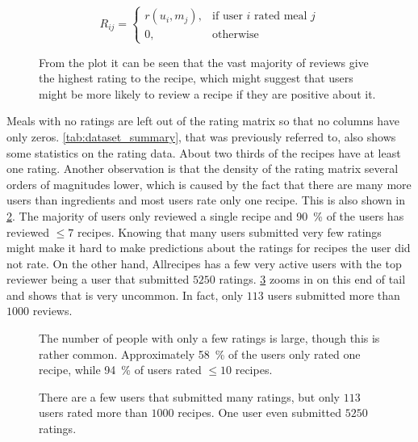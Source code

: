 \begin{equation*}
	\tag{Rating matrix}
	R_{ij}=
	\begin{cases}
	    r(u_i, m_j),& \text{if user } i \text{ rated meal } j \\
	    0,& \text{otherwise}
	\end{cases}
\end{equation*}

\begin{figure}[htbp]
	\centering
	
	\caption{From the plot it can be seen that the vast majority of reviews give the highest rating to the recipe, which might suggest that users might be more likely to review a recipe if they are positive about it.}
	\label{fig:user_ratings}
\end{figure}

Meals with no ratings are left out of the rating matrix so that no columns have only zeros.
\cref{tab:dataset_summary}, that was previously referred to, also shows some statistics on the rating data.
About two thirds of the recipes have at least one rating.
Another observation is that the density of the rating matrix several orders of magnitudes lower, which is caused by the fact that there are many more users than ingredients and most users rate only one recipe.
This is also shown in \cref{fig:user_little_ratings}.
The majority of users only reviewed a single recipe and \SI{90}{\percent} of the users has reviewed $\leq 7$ recipes.
Knowing that many users submitted very few ratings might make it hard to make predictions about the ratings for recipes the user did not rate.
On the other hand, Allrecipes has a few very active users with the top reviewer being a user that submitted $\num{5250}$ ratings.
\cref{fig:user_many_ratings} zooms in on this end of tail and shows that is very uncommon.
In fact, only $113$ users submitted more than $\num{1000}$ reviews.

\begin{figure}[htbp]
	\centering
	
	\caption{The number of people with only a few ratings is large, though this is rather common. Approximately \SI{58}{\percent} of the users only rated one recipe, while \SI{94}{\percent} of users rated $\leq 10$ recipes.}
	\label{fig:user_little_ratings}
\end{figure}

\begin{figure}[htbp]
	\centering
	
	\caption{There are a few users that submitted many ratings, but only $113$ users rated more than $1000$ recipes. One user even submitted $\num{5250}$ ratings.}
	\label{fig:user_many_ratings}
\end{figure}


